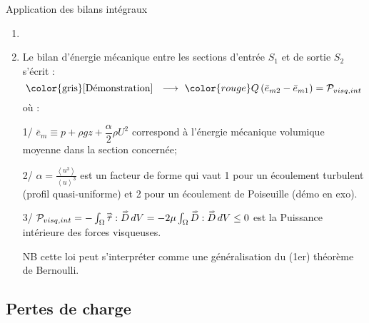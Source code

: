 \begin{frame}{Application des bilans intégraux}
\begin{enumerate}
\item[]
\item
	Le \textcolor{vert}{bilan d'énergie mécanique} entre les sections d'entrée $S_1$
  et de sortie $S_2$ s'écrit :
	\[
		\mbox{\color{gris} [Démonstration] \; $\longrightarrow$ \;}
		\color{rouge}
		Q \left( \bar{e}_{m2} - \bar{e}_{m1} \right) = {\cal P}_{visq,int}	\]
	où :
	
	
	
	1/ 	$
		\bar{e}_m \equiv p + \rho g z 
		+ \dfrac{\alpha}{2} \rho U^2
	$
	correspond à l'énergie mécanique volumique moyenne dans la section concernée; 
	
	2/ $\alpha =  \frac{\left< u^3 \right>}{\left< u \right>^3}$ est un facteur de forme qui vaut 1 pour un écoulement turbulent (profil quasi-uniforme) et 2 pour un écoulement de Poiseuille (démo en exo).
	
	3/   
	${\cal P}_{visq,int} = - \int_\Omega \accentset{\Rightarrow}{\tau}: \accentset{\Rightarrow}{D} \, dV =- 2\mu  \int_\Omega \accentset{\Rightarrow}{D} : \accentset{\Rightarrow}{D} \, dV \le 0
      $ est la Puissance intérieure des forces visqueuses.

	NB cette loi peut s'interpréter comme une généralisation du (1er) théorème de Bernoulli.
	
	

\end{enumerate}

\vspace{0mm}

\end{frame}

\subsection{Pertes de charge}

